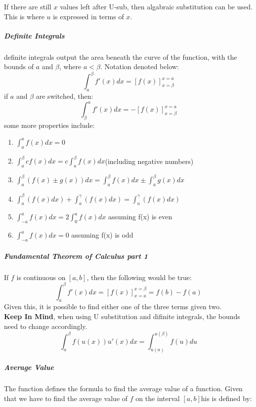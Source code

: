 \documentclass{article} %
\theoremstyle{theorem}
\theoremstyle{definition}
\begin{document}
                    If there are still $x$ values left after U-sub, then algabraic substitution can be used. This is where $u$ is expressed in terms of $x$.
                \subparagraph{Definite Integrals}
                    definite integrals output the area beneath the curve of the function, with the bounds of $a$ and $\beta$, where $a<\beta$. Notation denoted below:
                    $$\int_{a}^{\beta}f'(x) dx = [f(x)]^{x=a}_{x=\beta}$$ 
                    if $a$ and $\beta$ are switched, then:
                    $$\int_{\beta}^{a}f'(x) dx = -[f(x)]^{x=a}_{x=\beta}$$
                    some more properties include:
                    \begin{enumerate}
                        \item $\int ^{a}_{a}f(x)dx = 0$
                        \item $\int _{a}^{\beta}cf(x)dx =c\int _{a}^{\beta}f(x)dx$(including negative numbers)
                        \item $\int _{a}^{\beta}(f(x)\pm g(x))dx = \int _{a}^{\beta}f(x)dx\pm \int _{a}^{\beta} g(x)dx$
                        \item $\int _{a}^{\beta}(f(x)dx)+\int ^{\gamma}_{a}(f(x)dx)=\int ^{\gamma}_{a}(f(x)dx)$
                        \item $\int ^{a}_{-a}f(x)dx=2\int ^{a}_{0}f(x)dx$ assuming f(x) is even
                        \item $\int ^{a}_{-a}f(x)dx=0$ assuming f(x) is odd
                    \end{enumerate}
                \subparagraph{Fundamental Theorem of Calculus part 1}
                \label{subp:FTCpt1}
                    If $f$ is continuous on $[a,b]$, then the following would be true:
                    \begin{equation}
                        \int^\beta_a f'(x)dx = [f(x)]^{x=\beta}_{x=a}=f(b)-f(a)
                    \end{equation}
                    Given this, it is possible to find either one of the three terms given two. 
                    \\\textbf{Keep In Mind}, when using U substitution and difinite integrals, the bounds need to change accordingly.
                    \begin{equation}
                        \int^\beta_a f(u(x))u'(x)dx = \int^{u(\beta)}_{u(a)}f(u)du
                    \end{equation}
                \subparagraph{Average Value}
                The function defines the formula to find the average value of a function. Given that we have to find the average value of $f$ on the interval $[a,b]$his is defined by: 
\end{document}
